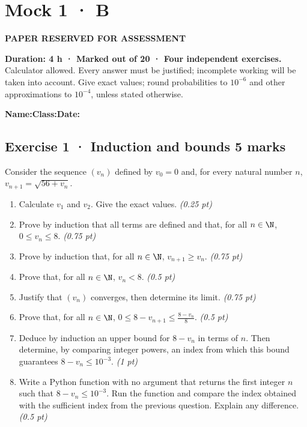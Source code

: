 \fi

\fi

\ifprof

\clearpage{}\label{sujet:5-4}

\section*{Mock 1 · B}

{\sffamily\bfseries\color{amber}PAPER RESERVED FOR ASSESSMENT\par}

\textbf{Duration: 4 h · Marked out of 20 · Four independent exercises.}\\Calculator allowed. Every answer must be justified; incomplete working will be taken into account. Give exact values; round probabilities to $10^{-6}$ and other approximations to $10^{-4}$, unless stated otherwise.

\smallskip\textbf{Name:}\enspace\dotfill\quad\textbf{Class:}\enspace\dotfill\quad\textbf{Date:}\enspace\dotfill

\subsection*{Exercise 1 · Induction and bounds \hfill 5 marks}Consider the sequence $(v_n)$ defined by $v_0=0$ and, for every natural number $n$, $v_{n+1}=\sqrt{56+v_n}$.

\begin{enumerate}

\item Calculate $v_1$ and $v_2$. Give the exact values. \hfill\textit{(0.25 pt)}

\item Prove by induction that all terms are defined and that, for all $n\in\N$, $0\le v_n\le8$. \hfill\textit{(0.75 pt)}

\item Prove by induction that, for all $n\in\N$, $v_{n+1}\ge v_n$. \hfill\textit{(0.75 pt)}

\item Prove that, for all $n\in\N$, $v_n<8$. \hfill\textit{(0.5 pt)}

\item Justify that $(v_n)$ converges, then determine its limit. \hfill\textit{(0.75 pt)}

\item Prove that, for all $n\in\N$, $0\le 8-v_{n+1}\le\frac{8-v_n}{8}$. \hfill\textit{(0.5 pt)}

\item Deduce by induction an upper bound for $8-v_n$ in terms of $n$. Then determine, by comparing integer powers, an index from which this bound guarantees $8-v_n\le10^{-3}$. \hfill\textit{(1 pt)}

\item Write a Python function with no argument that returns the first integer $n$ such that $8-v_n\le10^{-3}$. Run the function and compare the index obtained with the sufficient index from the previous question. Explain any difference. \hfill\textit{(0.5 pt)}

\end{enumerate}

